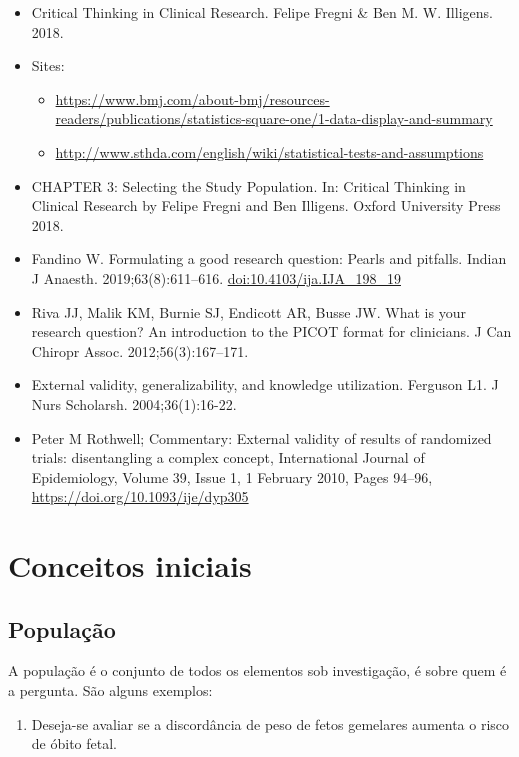 \documentclass[
]{book}
\providecommand{\tightlist}{%
  \setlength{\itemsep}{0pt}\setlength{\parskip}{0pt}}
\begin{document}
\begin{itemize}
\item
  Critical Thinking in Clinical Research. Felipe Fregni \& Ben M. W. Illigens. 2018.
\item
  Sites:

  \begin{itemize}
  \item
    \url{https://www.bmj.com/about-bmj/resources-readers/publications/statistics-square-one/1-data-display-and-summary}
  \item
    \url{http://www.sthda.com/english/wiki/statistical-tests-and-assumptions}
  \end{itemize}
\item
  CHAPTER 3: Selecting the Study Population. In: Critical Thinking in Clinical Research by Felipe Fregni and Ben Illigens. Oxford University Press 2018.
\item
  Fandino W. Formulating a good research question: Pearls and pitfalls. Indian J Anaesth. 2019;63(8):611--616. \url{doi:10.4103/ija.IJA_198_19}
\item
  Riva JJ, Malik KM, Burnie SJ, Endicott AR, Busse JW. What is your research question? An introduction to the PICOT format for clinicians. J Can Chiropr Assoc. 2012;56(3):167--171.
\item
  External validity, generalizability, and knowledge utilization. Ferguson L1. J Nurs Scholarsh. 2004;36(1):16-22.
\item
  Peter M Rothwell; Commentary: External validity of results of randomized trials: disentangling a complex concept, International Journal of Epidemiology, Volume 39, Issue 1, 1 February 2010, Pages 94--96, \url{https://doi.org/10.1093/ije/dyp305}
\end{itemize}

\hypertarget{conceitos-iniciais}{%
\chapter{Conceitos iniciais}\label{conceitos-iniciais}}

\hypertarget{populauxe7uxe3o}{%
\section{População}\label{populauxe7uxe3o}}

A população é o conjunto de todos os elementos sob investigação, é sobre quem é a pergunta. São alguns exemplos:

\begin{enumerate}
\def\labelenumi{\arabic{enumi}.}
\tightlist
\item
  Deseja-se avaliar se a discordância de peso de fetos gemelares aumenta o risco de óbito fetal.
\end{enumerate}
\end{document}
